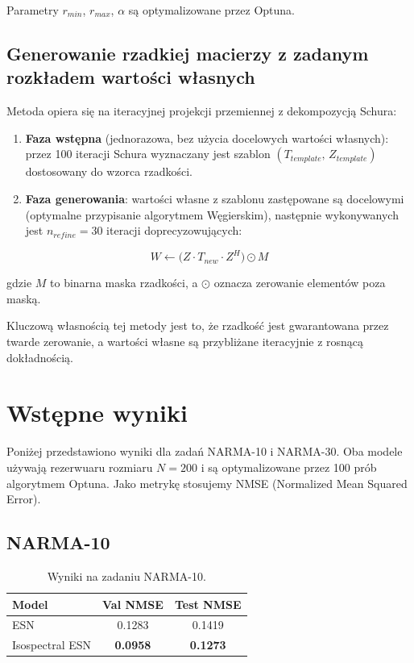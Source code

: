 \documentclass[12pt, a4paper]{article}
\begin{document}
Parametry $r_{min}$, $r_{max}$, $\alpha$ są optymalizowane przez Optuna.

\subsection{Generowanie rzadkiej macierzy z zadanym rozkładem wartości własnych}

Metoda opiera się na iteracyjnej projekcji przemiennej z dekompozycją Schura:

\begin{enumerate}
    \item \textbf{Faza wstępna} (jednorazowa, bez użycia docelowych wartości własnych): przez 100 iteracji Schura wyznaczany jest szablon $(T_{template},\, Z_{template})$ dostosowany do wzorca rzadkości.
    \item \textbf{Faza generowania}: wartości własne z szablonu zastępowane są docelowymi (optymalne przypisanie algorytmem Węgierskim), następnie wykonywanych jest $n_{refine} = 30$ iteracji doprecyzowujących:
\end{enumerate}

\begin{equation}
    W \leftarrow \bigl(Z \cdot T_{new} \cdot Z^H\bigr) \odot M
\end{equation}

gdzie $M$ to binarna maska rzadkości, a $\odot$ oznacza zerowanie elementów poza maską.

Kluczową własnością tej metody jest to, że rzadkość jest gwarantowana przez twarde zerowanie, a wartości własne są przybliżane iteracyjnie z rosnącą dokładnością.

\section{Wstępne wyniki}

Poniżej przedstawiono wyniki dla zadań NARMA-10 i NARMA-30. Oba modele używają rezerwuaru rozmiaru $N = 200$ i są optymalizowane przez 100 prób algorytmem Optuna. Jako metrykę stosujemy NMSE (Normalized Mean Squared Error).

\subsection{NARMA-10}

\begin{table}[h]
\centering
\begin{tabular}{lcc}
\toprule
Model & Val NMSE & Test NMSE \\
\midrule
ESN             & 0.1283 & 0.1419 \\
Isospectral ESN & \textbf{0.0958} & \textbf{0.1273} \\
\bottomrule
\end{tabular}
\caption{Wyniki na zadaniu NARMA-10.}
\end{table}
\end{document}

